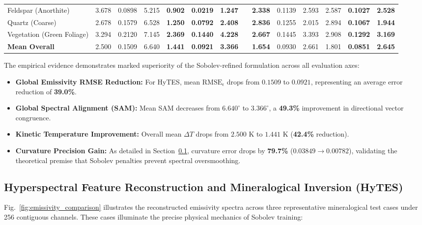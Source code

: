 \documentclass[journal]{IEEEtran}
\begin{document}
\begin{table}[!t]
{\begin{tabular}{lccccccccccccc}
Feldspar (Anorthite) & 3.678 & 0.0898 & 5.215 & \textbf{0.902} & \textbf{0.0219} & \textbf{1.247} & & \textbf{2.338} & 0.1139 & 2.593 & 2.587 & \textbf{0.1027} & \textbf{2.528} \\
Quartz (Coarse) & 2.678 & 0.1579 & 6.528 & \textbf{1.250} & \textbf{0.0792} & \textbf{2.408} & & \textbf{2.836} & 0.1255 & 2.015 & 2.894 & \textbf{0.1067} & \textbf{1.944} \\
Vegetation (Green Foliage) & 3.294 & 0.2120 & 7.145 & \textbf{2.369} & \textbf{0.1440} & \textbf{4.228} & & \textbf{2.667} & 0.1445 & 3.393 & 2.908 & \textbf{0.1292} & \textbf{3.169} \\
\midrule
\textbf{Mean Overall} & 2.500 & 0.1509 & 6.640 & \textbf{1.441} & \textbf{0.0921} & \textbf{3.366} & & \textbf{1.654} & 0.0930 & 2.661 & 1.801 & \textbf{0.0851} & \textbf{2.645} \\
\bottomrule
\end{tabular}%
}
\end{table}

The empirical evidence demonstrates marked superiority of the Sobolev-refined formulation across all evaluation axes:
\begin{itemize}
    \item \textbf{Global Emissivity RMSE Reduction:} For HyTES, mean $\text{RMSE}_\epsilon$ drops from $0.1509$ to $0.0921$, representing an average error reduction of \textbf{39.0\%}.
    \item \textbf{Global Spectral Alignment (SAM):} Mean SAM decreases from $6.640^\circ$ to $3.366^\circ$, a \textbf{49.3\%} improvement in directional vector congruence.
    \item \textbf{Kinetic Temperature Improvement:} Overall mean $\Delta T$ drops from $2.500\text{ K}$ to $1.441\text{ K}$ (\textbf{42.4\%} reduction).
    \item \textbf{Curvature Precision Gain:} As detailed in Section~\ref{subsec:hytes_features}, curvature error drops by \textbf{79.7\%} ($0.03849 \rightarrow 0.00782$), validating the theoretical premise that Sobolev penalties prevent spectral oversmoothing.
\end{itemize}

\subsection{Hyperspectral Feature Reconstruction and Mineralogical Inversion (HyTES)}
\label{subsec:hytes_features}
Fig.~\ref{fig:emissivity_comparison} illustrates the reconstructed emissivity spectra across three representative mineralogical test cases under 256 contiguous channels. These cases illuminate the precise physical mechanics of Sobolev training:
\end{document}
